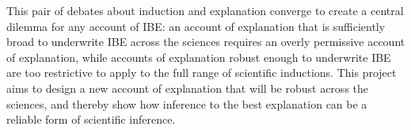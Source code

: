 \documentclass{article}[11pt]
\begin{document}
This pair of debates about induction and explanation converge to create a central dilemma for any account of IBE: an account of explanation that is sufficiently broad to underwrite IBE across the sciences requires an overly permissive account of explanation, while accounts of explanation robust enough to underwrite IBE are too restrictive to apply to the full range of scientific inductions.  This project aims to design a new account of explanation that will be robust across the sciences, and thereby show how inference to the best explanation can be a reliable form of scientific inference.



\end{document}

